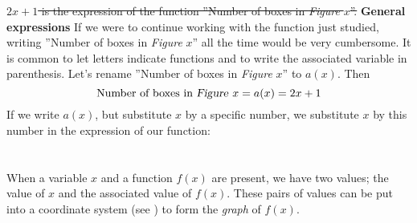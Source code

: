 \st{$ {2x+1} $ is the expression of the function ''Number of boxes in \textsl{Figure }$ x $''.}
\newpage
\textbf{General expressions} \os
If we were to continue working with the function just studied, writing ''Number of boxes in \textsl{Figure }$ x $'' all the time would be very cumbersome. It is common to let letters indicate functions and to write the associated variable in parenthesis. Let's rename ''Number of boxes in \textsl{Figure} $ x $'' to $ a(x) $. Then
\[ \text{Number of boxes in \textsl{Figure }}x=a(x)=2x+1 \]
If we write $ a(x) $, but substitute $ x $ by a specific number, we substitute $ x $ by this number in the expression of our function:
\newpage
{}
\section{\lingraf}
When a variable $ x $ and a function $ f(x)  $ are present, we have two values; the value of $ x $ and the associated value of $ f(x) $. These pairs of values can be put into a coordinate system (see ) to form the  \textit{graph} of $ f(x) $. \vsk

